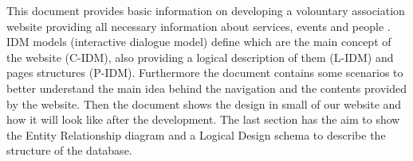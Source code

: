 This document provides basic information on developing a volountary association website providing all necessary information about services, events and people . IDM models (interactive dialogue model) define which are the main concept of the website (C-IDM), also providing a logical description of them (L-IDM) and pages structures (P-IDM). Furthermore the document contains some scenarios to better understand the main idea behind the navigation and the contents provided by the website. Then the document shows the design in small of our website and how it will look like after the development. The last section has the aim to show the Entity Relationship diagram and a Logical Design schema to describe the structure of the database.